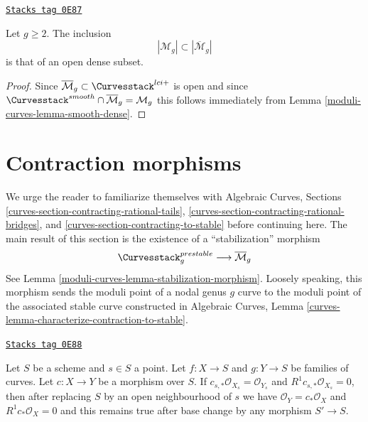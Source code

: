 \begin{lemma}
\label{moduli-curves-lemma-smooth-dense-in-stable}
\href{https://stacks.math.columbia.edu/tag/0E87}{\texttt{Stacks tag 0E87}}

Let $g \geq 2$. The inclusion
$$
|\mathcal{M}_g| \subset |\overline{\mathcal{M}}_g|
$$
is that of an open dense subset.
\end{lemma}

\begin{proof}
Since $\overline{\mathcal{M}}_g \subset \Curvesstack^{lci+}$
is open and since
$\Curvesstack^{smooth} \cap \overline{\mathcal{M}}_g = \mathcal{M}_g$
this follows immediately from
Lemma \ref{moduli-curves-lemma-smooth-dense}.
\end{proof}

\section{Contraction morphisms}
\label{moduli-curves-section-contracting}
We urge the reader to familiarize themselves with
Algebraic Curves, Sections
\ref{curves-section-contracting-rational-tails},
\ref{curves-section-contracting-rational-bridges}, and
\ref{curves-section-contracting-to-stable}
before continuing here. The main result of this section
is the existence of a ``stabilization'' morphism
$$
\Curvesstack^{prestable}_g
\longrightarrow
\overline{\mathcal{M}}_g
$$
See Lemma \ref{moduli-curves-lemma-stabilization-morphism}.
Loosely speaking, this morphism sends the moduli point of
a nodal genus $g$ curve to the moduli point of the associated stable
curve constructed in
Algebraic Curves, Lemma \ref{curves-lemma-characterize-contraction-to-stable}.

\begin{lemma}[Contract]
\label{moduli-curves-lemma-contract}
\href{https://stacks.math.columbia.edu/tag/0E88}{\texttt{Stacks tag 0E88}}

Let $S$ be a scheme and $s \in S$ a point.
Let $f : X \to S$ and $g : Y \to S$ be families of curves.
Let $c : X \to Y$ be a morphism over $S$. If
$c_{s, *}\mathcal{O}_{X_s} = \mathcal{O}_{Y_s}$ and
$R^1c_{s, *}\mathcal{O}_{X_s} = 0$, then
after replacing $S$ by an open neighbourhood of $s$
we have $\mathcal{O}_Y = c_*\mathcal{O}_X$ and $R^1c_*\mathcal{O}_X = 0$
and this remains true after base change by any morphism $S' \to S$.
\end{lemma}

